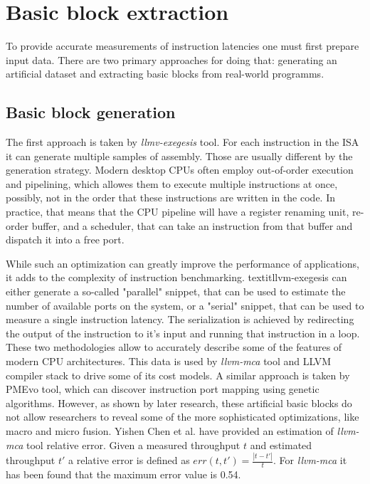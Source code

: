 \section{Basic block extraction}

To provide accurate measurements of instruction latencies one must first prepare input data. There are two primary approaches for doing that: generating an artificial dataset and extracting basic blocks from real-world programms.

\subsection{Basic block generation}

The first approach is taken by \textit{llmv-exegesis} tool. For each instruction in the ISA it can generate multiple samples of assembly. Those are usually different by the generation strategy. Modern desktop CPUs often employ out-of-order execution and pipelining, which allowes them to execute multiple instructions at once, possibly, not in the order that these instructions are written in the code. In practice, that means that the CPU pipeline will have a register renaming unit, re-order buffer, and a scheduler, that can take an instruction from that buffer and dispatch it into a free port.

While such an optimization can greatly improve the performance of applications, it adds to the complexity of instruction benchmarking. textit{llvm-exegesis} can either generate a so-called "parallel" snippet, that can be used to estimate the number of available ports on the system, or a "serial" snippet, that can be used to measure a single instruction latency. The serialization is achieved by redirecting the output of the instruction to it's input and running that instruction in a loop. These two methodologies allow to accurately describe some of the features of modern CPU architectures. This data is used by \textit{llvm-mca} tool and LLVM compiler stack to drive some of its cost models. A similar approach is taken by PMEvo tool, which can discover instruction port mapping using genetic algorithms\cite{ritterPMEvoPortableInference2020}. However, as shown by later research, these artificial basic blocks do not allow researchers to reveal some of the more sophisticated optimizations, like macro and micro fusion. Yishen Chen et al. \cite{chenBHiveBenchmarkSuite2019} have provided an estimation of \textit{llvm-mca} tool relative error. Given a measured throughput $t$ and estimated throughput $t'$ a relative error is defined as $err(t, t') = \frac{|t - t'|}{t}$. For \textit{llvm-mca} it has been found that the maximum error value is 0.54.

